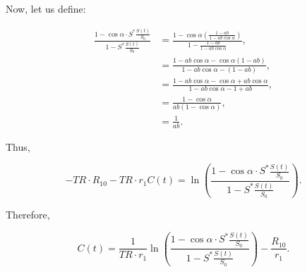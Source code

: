 Now, let us define:

\begin{align}
  \frac{1 - \cos \alpha \cdot S^{*}\frac{S(t)}{S_0}}{1 - S^{*}\frac{S(t)}{S_0}} &= \frac{ 1 - \cos \alpha\left(\frac{1 - a b}{1 - a b \cos \alpha}\right)} {1 - \frac{1 - a b}{1 - a b \cos \alpha}} , \\
  &= \frac{1 - a b \cos \alpha - \cos \alpha(1 - a b)}{1 - a b \cos \alpha - (1 - a b)} , \\
  &= \frac{1 - a b \cos \alpha - \cos \alpha + a b \cos \alpha}{1 - a b \cos \alpha - 1 + a b} , \\
  &= \frac{1 - \cos \alpha}{ ab (1 - \cos \alpha)}, \\
  &= \frac{1}{a b}.
\end{align}

Thus,

\begin{equation}
  -TR \cdot R_{10} -TR \cdot r_1 C(t) = \ln\left( \frac{1 - \cos \alpha \cdot S^{*}\frac{S(t)}{S_0}}{1 - S^{*}\frac{S(t)}{S_0}} \right) .
\end{equation}

Therefore,

\begin{equation}
  C(t) = \frac{1}{TR \cdot r_1} \ln\left( \frac{1 - \cos \alpha \cdot S^{*}\frac{S(t)}{S_0}}{1 - S^{*}\frac{S(t)}{S_0}} \right) - \frac{R_{10}}{r_1} .
\end{equation}


